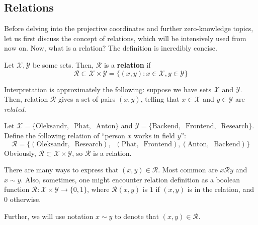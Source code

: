 \documentclass[../lecture-notes.tex]{subfiles}
\begin{document}
\subsection{Relations}\label{section:relations}

Before delving into the projective coordinates and further zero-knowledge topics, let us first discuss the concept of relations, which will be intensively used from now on. Now, what is a relation? The definition is incredibly concise.

\begin{definition}
    Let $\mathcal{X},\mathcal{Y}$ be some sets. Then, $\mathcal{R}$ is a \textbf{relation} if 
    \begin{equation*}
        \mathcal{R} \subset \mathcal{X} \times \mathcal{Y} = \{(x,y): x \in \mathcal{X}, y \in \mathcal{Y}\}
    \end{equation*}
\end{definition}

Interpretation is approximately the following: suppose we have sets $\mathcal{X}$ and $\mathcal{Y}$. Then, relation $\mathcal{R}$ gives a set of pairs $(x,y)$, telling that $x \in \mathcal{X}$ and $y \in \mathcal{Y}$ are \textit{related}.

\begin{example}
    Let $\mathcal{X} = \{\text{Oleksandr}, \;\; \text{Phat}, \;\; \text{Anton}\}$ and $\mathcal{Y} = \{\text{Backend}, \;\; \text{Frontend}, \;\; \text{Research}\}$. Define the following relation of ``person $x$ works in field $y$'':
    \begin{equation*}
        \mathcal{R} = \{(\text{Oleksandr}, \;\; \text{Research}), \;\; (\text{Phat}, \;\; \text{Frontend}), (\text{Anton}, \;\; \text{Backend})\}
    \end{equation*}
    Obviously, $\mathcal{R} \subset \mathcal{X} \times \mathcal{Y}$, so $\mathcal{R}$ is a relation.
\end{example}

\begin{remark}
    There are many ways to express that $(x,y) \in \mathcal{R}$. Most common are $x \mathcal{R} y$ and $x \sim y$. Also, sometimes, one might encounter relation definition as a boolean function $\mathcal{R}: \mathcal{X} \times \mathcal{Y} \to \{0,1\}$, where $\mathcal{R}(x,y)$ is $1$ if $(x,y)$ is in the relation, and $0$ otherwise.

    Further, we will use notation $x \sim y$ to denote that $(x,y) \in \mathcal{R}$.
\end{remark}
\end{document}
